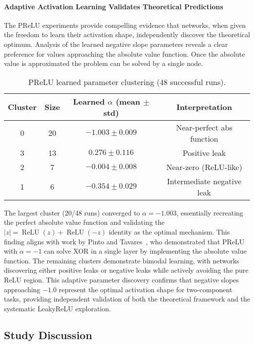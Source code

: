 \paragraph{Adaptive Activation Learning Validates Theoretical Predictions}
The PReLU experiments provide compelling evidence that networks, when given the freedom to learn their activation shape, independently discover the theoretical optimum. Analysis of the learned negative slope parameters reveals a clear preference for values approaching the absolute value function. Once the absolute value is approximated the problem can be solved by a single node.

\begin{table}[ht]
\centering
\caption{PReLU learned parameter clustering (48 successful runs).}
\label{tab:relu1-prelu-learned}
\begin{tabular}{cccc}
\toprule
Cluster & Size & Learned $\alpha$ (mean $\pm$ std) & Interpretation \\
\midrule
0 & 20 & $-1.003 \pm 0.009$ & Near-perfect abs function \\
3 & 13 & $0.276 \pm 0.116$ & Positive leak \\
2 & 7 & $-0.004 \pm 0.008$ & Near-zero (ReLU-like) \\
1 & 6 & $-0.354 \pm 0.029$ & Intermediate negative leak \\
\bottomrule
\end{tabular}
\end{table}

The largest cluster (20/48 runs) converged to $\alpha = -1.003$, essentially recreating the perfect absolute value function and validating the $|z| = \operatorname{ReLU}(z) + \operatorname{ReLU}(-z)$ identity as the optimal mechanism. This finding aligns with work by Pinto and Tavares~\cite{pinto2024prelu}, who demonstrated that PReLU with $\alpha = -1$ can solve XOR in a single layer by implementing the absolute value function. The remaining clusters demonstrate bimodal learning, with networks discovering either positive leaks or negative leaks while actively avoiding the pure ReLU region. This adaptive parameter discovery confirms that negative slopes approaching $-1.0$ represent the optimal activation shape for two-component tasks, providing independent validation of both the theoretical framework and the systematic LeakyReLU exploration.


\subsection*{Study Discussion}


